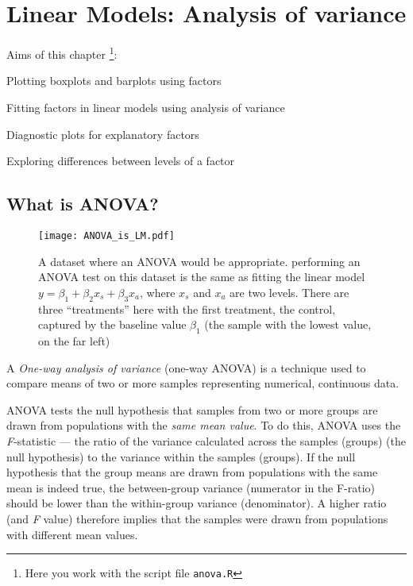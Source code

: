 \chapter{Linear Models: Analysis of variance}
\label{ch:ANOVA}

Aims of this chapter \footnote{Here you work with the script file {\tt anova.R}}:
\begin{compactitem}
	\item Plotting boxplots and barplots using factors
	\item Fitting factors in linear models using analysis of variance
	\item Diagnostic plots for explanatory factors
	\item Exploring differences between levels of a factor
\end{compactitem}

\section{What is ANOVA?}

\begin{figure}
	\centering
	\texttt{[image: ANOVA\_is\_LM.pdf]} 

	\caption{A dataset where an ANOVA would be appropriate. performing an 
	ANOVA test on this dataset is the same as fitting the linear model  
	$y  = \beta_1  + \beta_2 x_s + \beta_3 x_a$, where $x_s$ and $x_a$ 
	are two levels. There are three ``treatments'' here with the first 
	treatment, the control, captured by the baseline value $\beta_1$ 
	(the sample with the lowest value, on the far left)}

	\label{fig:anova1} 

\end{figure}

A {\it One-way analysis of variance} (one-way ANOVA) is a technique 
used to compare means of two or more samples representing numerical, 
continuous data. 

ANOVA tests the null hypothesis that samples from two or more groups 
are drawn from populations with the {\it same mean value}. To do this, 
ANOVA uses the {\it F}-statistic --- the ratio of the variance 
calculated across the samples (groups) (the null hypothesis) to the 
variance within the samples (groups). If the null hypothesis that the 
group means are drawn from populations with the same mean is indeed 
true, the between-group variance (numerator in the F-ratio) should be 
lower than the within-group variance (denominator). A higher ratio (and 
{\it F} value) therefore implies that the samples were drawn from 
populations with different mean values.

